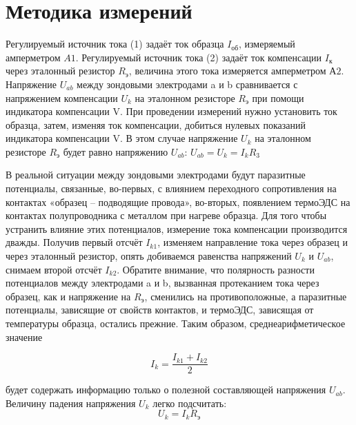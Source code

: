 \section{Методика измерений}


Регулируемый источник тока (1) задаёт ток образца $I_\text{об}$, измеряемый амперметром $A1$. Регулируемый источник тока (2) задаёт ток компенсации $I_\text{к}$ через эталонный резистор $R_\text{э}$, величина этого тока измеряется амперметром $А2$. Напряжение $U_{ab}$ между зондовыми электродами a и b сравнивается с напряжением компенсации $U_k$ на эталонном резисторе $R_\text{э}$ при помощи индикатора компенсации V.
При проведении измерений нужно установить ток образца, затем, изменяя ток компенсации, добиться нулевых показаний индикатора компенсации V. В этом случае напряжение $U_k$ на эталонном резисторе $R_\text{э}$ будет равно напряжению $U_{ab}$:
$U_{ab}=U_{k}=I_{k} R_{3}$ 

В реальной ситуации между зондовыми электродами будут паразитные потенциалы, связанные, во-первых, с влиянием переходного сопротивления на контактах «образец – подводящие провода», во-вторых, появлением термоЭДС на контактах полупроводника с металлом при нагреве образца. 
Для того чтобы устранить влияние этих потенциалов, измерение тока компенсации производится дважды. Получив первый отсчёт $I_{k1}$, изменяем направление тока через образец и через эталонный резистор, опять добиваемся равенства напряжений $U_k$ и $U_{ab}$, снимаем второй отсчёт $I_{k2}$. 
Обратите внимание, что полярность разности потенциалов между электродами a и b, вызванная протеканием тока через образец, как и напряжение на $R_\text{э}$, сменились на противоположные, а паразитные потенциалы, зависящие от свойств контактов, и термоЭДС, зависящая от температуры образца, остались прежние. Таким образом, среднеарифметическое значение 

$$I_k=\frac{I_{k1}+I_{k2}}{2}$$

будет содержать информацию только о полезной составляющей напряжения $U_{ab}$.
Величину падения напряжения $U_k$ легко подсчитать:
$$U_{k}=I_{k} R_{\text{э}}$$

